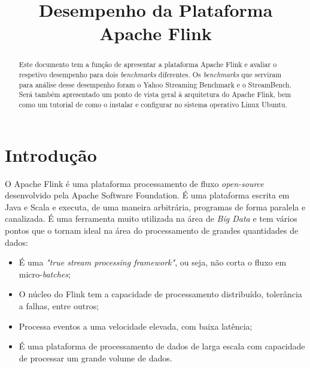 \documentclass[conference]{IEEEtran}
\begin{document}
\title{Desempenho da Plataforma Apache Flink}

\author{
\and
{}
}

\maketitle

\begin{abstract}
Este documento tem a função de apresentar a plataforma Apache Flink e avaliar o respetivo desempenho para dois \emph{benchmarks} diferentes. Os \emph{benchmarks} que serviram para análise desse desempenho foram o Yahoo Streaming Benchmark e o StreamBench. Será também apresentado um ponto de vista geral à arquitetura do Apache Flink, bem como um tutorial de como o instalar e configurar no sistema operativo Linux Ubuntu.
\end{abstract}

\section{Introdução}
\label{intro}

O Apache Flink é uma plataforma processamento de fluxo \emph{open-source} desenvolvido pela Apache Software Foundation. É uma plataforma escrita em Java e Scala e executa, de uma maneira arbitrária, programas de forma paralela e canalizada. É uma ferramenta muito utilizada na área de \emph{Big Data} e tem vários pontos que o tornam ideal na área do processamento de grandes quantidades de dados:

\begin{itemize}
    \item É uma \emph{"true stream processing framework"}, ou seja, não corta o fluxo em micro-\emph{batches};
    \item O núcleo do Flink tem a capacidade de processamento distribuído, tolerância a falhas, entre outros;
    \item Processa eventos a uma velocidade elevada, com baixa latência;
    \item É uma plataforma de processamento de dados de larga escala com capacidade de processar um grande volume de dados.
\end{itemize}
\end{document}
